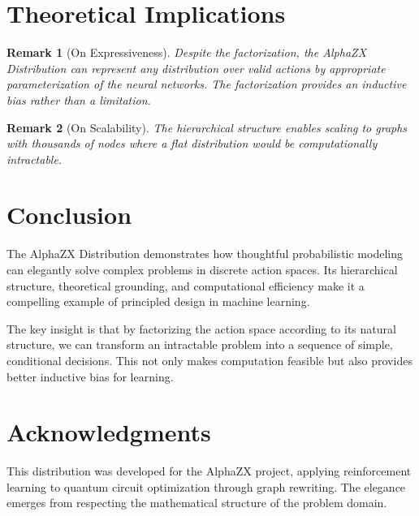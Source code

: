 \documentclass[11pt,a4paper]{article}
\newtheorem{remark}{Remark}
\begin{document}
\section{Theoretical Implications}

\begin{remark}[On Expressiveness]
Despite the factorization, the AlphaZX Distribution can represent any distribution over valid actions by appropriate parameterization of the neural networks. The factorization provides an inductive bias rather than a limitation.
\end{remark}

\begin{remark}[On Scalability]
The hierarchical structure enables scaling to graphs with thousands of nodes where a flat distribution would be computationally intractable.
\end{remark}

\section{Conclusion}

The AlphaZX Distribution demonstrates how thoughtful probabilistic modeling can elegantly solve complex problems in discrete action spaces. Its hierarchical structure, theoretical grounding, and computational efficiency make it a compelling example of principled design in machine learning.

The key insight is that by factorizing the action space according to its natural structure, we can transform an intractable problem into a sequence of simple, conditional decisions. This not only makes computation feasible but also provides better inductive bias for learning.

\section*{Acknowledgments}

This distribution was developed for the AlphaZX project, applying reinforcement learning to quantum circuit optimization through graph rewriting. The elegance emerges from respecting the mathematical structure of the problem domain.
\end{document}
